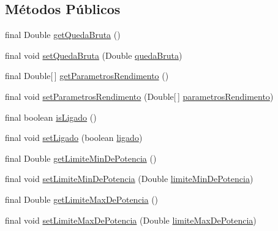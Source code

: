 \subsection*{Métodos Públicos}
\begin{DoxyCompactItemize}
\item 
final Double \hyperlink{classusina_1_1_d_a_o_1_1turbina_1_1_turbina_transfer_a4c2bbe761c866e3c72ebbe275831bca8}{get\-Queda\-Bruta} ()
\item 
final void \hyperlink{classusina_1_1_d_a_o_1_1turbina_1_1_turbina_transfer_a4c5de3da4b8cee3c55854ad7a57f65ac}{set\-Queda\-Bruta} (Double \hyperlink{classusina_1_1_d_a_o_1_1turbina_1_1_turbina_transfer_a5b40ddc2d5b209be42cd79baf5a0d83f}{queda\-Bruta})
\item 
final Double\mbox{[}$\,$\mbox{]} \hyperlink{classusina_1_1_d_a_o_1_1turbina_1_1_turbina_transfer_a2454a13b262136b3512301578b064c28}{get\-Parametros\-Rendimento} ()
\item 
final void \hyperlink{classusina_1_1_d_a_o_1_1turbina_1_1_turbina_transfer_a09817f72c0526dcaa4f4cedad4dd15d9}{set\-Parametros\-Rendimento} (Double\mbox{[}$\,$\mbox{]} \hyperlink{classusina_1_1_d_a_o_1_1turbina_1_1_turbina_transfer_a8395d06deeaaf0d3d525a48cb1e27d80}{parametros\-Rendimento})
\item 
final boolean \hyperlink{classusina_1_1_d_a_o_1_1turbina_1_1_turbina_transfer_ac37f79918c89ff4c9b6e2ef91292b7b0}{is\-Ligado} ()
\item 
final void \hyperlink{classusina_1_1_d_a_o_1_1turbina_1_1_turbina_transfer_ae559cf1382c97ffc970c9f4b92d7320f}{set\-Ligado} (boolean \hyperlink{classusina_1_1_d_a_o_1_1turbina_1_1_turbina_transfer_ae108175db307ad716b1508b2be10dba3}{ligado})
\item 
final Double \hyperlink{classusina_1_1_d_a_o_1_1turbina_1_1_turbina_transfer_a311e11662731ef3fa7b66c2e2c30eff2}{get\-Limite\-Min\-De\-Potencia} ()
\item 
final void \hyperlink{classusina_1_1_d_a_o_1_1turbina_1_1_turbina_transfer_aa161048f74571f11ce32207b5109463b}{set\-Limite\-Min\-De\-Potencia} (Double \hyperlink{classusina_1_1_d_a_o_1_1turbina_1_1_turbina_transfer_a9b91ed0c68d559ef9c7e2ea953bf052a}{limite\-Min\-De\-Potencia})
\item 
final Double \hyperlink{classusina_1_1_d_a_o_1_1turbina_1_1_turbina_transfer_acbfc16ec00fe281cb844cddaac8c0543}{get\-Limite\-Max\-De\-Potencia} ()
\item 
final void \hyperlink{classusina_1_1_d_a_o_1_1turbina_1_1_turbina_transfer_a444a133dd9727b2f04b0939d6f1c93fc}{set\-Limite\-Max\-De\-Potencia} (Double \hyperlink{classusina_1_1_d_a_o_1_1turbina_1_1_turbina_transfer_aaec5e55fb790620bbf92f759a3165a97}{limite\-Max\-De\-Potencia})

\end{DoxyCompactItemize}
